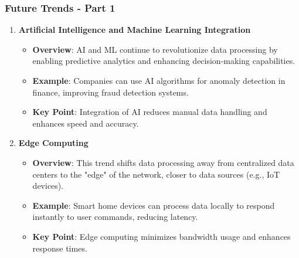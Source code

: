 \documentclass{beamer}
\begin{document}
\begin{frame}[fragile]
    \frametitle{Future Trends - Part 1}
    
    \begin{enumerate}
        \item \textbf{Artificial Intelligence and Machine Learning Integration}
            \begin{itemize}
                \item \textbf{Overview}: AI and ML continue to revolutionize data processing by enabling predictive analytics and enhancing decision-making capabilities.
                \item \textbf{Example}: Companies can use AI algorithms for anomaly detection in finance, improving fraud detection systems.
                \item \textbf{Key Point}: Integration of AI reduces manual data handling and enhances speed and accuracy.
            \end{itemize}
        
        \item \textbf{Edge Computing}
            \begin{itemize}
                \item \textbf{Overview}: This trend shifts data processing away from centralized data centers to the "edge" of the network, closer to data sources (e.g., IoT devices).
                \item \textbf{Example}: Smart home devices can process data locally to respond instantly to user commands, reducing latency.
                \item \textbf{Key Point}: Edge computing minimizes bandwidth usage and enhances response times.
            \end{itemize}
    \end{enumerate}
\end{frame}
\end{document}

